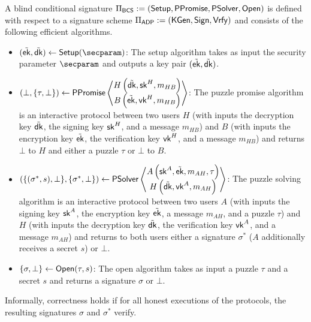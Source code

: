 \begin{definition}
    A blind conditional signature $\Pi_\mathsf{BCS}\allowbreak :=(\mathsf{Setup}, \mathsf{PPromise}, \mathsf{PSolver}, \mathsf{Open})$ is defined with respect to a signature scheme $\Pi_{\mathsf{ADP}} := (\mathsf{KGen},\mathsf{Sign},\mathsf{Vrfy})$ and consists of the following efficient algorithms.
    
    \begin{itemize}%
    \item {$(\tilde{\ek}, \tilde{\dk})\gets \setup(\secparam)$}: The setup algorithm takes as input the security parameter $\secparam$ and outputs a key pair $(\tilde{\mathsf{ek}}, \tilde{\mathsf{dk}})$.
    \item {$(\bot, \{\tau, \bot\}) \gets \mathsf{PPromise} \left\langle \begin{matrix} H \left(\tilde{\mathsf{dk}}, \mathsf{sk}^H, m_{HB} \right)\\ B \left(\tilde{\mathsf{ek}}, \mathsf{vk}^H, m_{HB} \right) \end{matrix} \right\rangle $}: The puzzle promise algorithm is an interactive protocol between two users $H$ (with inputs the decryption key $\tilde{\mathsf{dk}}$, the signing key $\mathsf{sk}^H$, and a message $m_{HB}$) and $B$ (with inputs the encryption key $\tilde{\mathsf{ek}}$, the verification key $\mathsf{vk}^H$, and a message $m_{HB}$)  and returns $\bot$ to $H$ and either a puzzle $\tau$ or $\bot$ to $B$.
    \item {$(\{(\sigma^*, s), \bot\}, \{\sigma^*, \bot\}) \gets \mathsf{PSolver} \left\langle \begin{matrix} A \left(\mathsf{sk}^A, \tilde{\mathsf{ek}}, m_{AH}, \tau\right)\\ H \left(\tilde{\mathsf{dk}}, \mathsf{vk}^A, m_{AH} \right) \end{matrix} \right\rangle $}: The puzzle solving algorithm is an interactive protocol between two users $A$ (with inputs the signing key $\mathsf{sk}^A$, the encryption key $\tilde{\mathsf{ek}}$, a message $m_{AH}$, and a puzzle $\tau$) and $H$ (with inputs the decryption key $\tilde {\mathsf{dk}}$, the verification key $\mathsf{vk}^A$, and a message $m_{AH}$) and returns to both users either a signature $\sigma^*$ ($A$ additionally receives a secret $s$) or $\bot$.
    \item {$\{\sigma, \bot\}\gets \mathsf{Open}(\tau, s)$}: The open algorithm takes as input a puzzle $\tau$ and a secret $s$ and returns a signature $\sigma$ or $\bot$.
    \end{itemize}
\end{definition}

Informally, correctness holds if for all honest executions of the protocols, the resulting signatures $\sigma$ and $\sigma^*$ verify.

